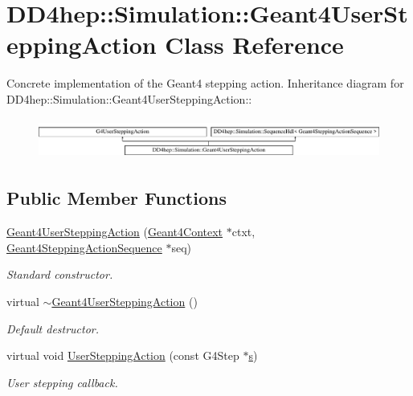 \hypertarget{class_d_d4hep_1_1_simulation_1_1_geant4_user_stepping_action}{
\section{DD4hep::Simulation::Geant4UserSteppingAction Class Reference}
\label{class_d_d4hep_1_1_simulation_1_1_geant4_user_stepping_action}
}


Concrete implementation of the Geant4 stepping action.  
Inheritance diagram for DD4hep::Simulation::Geant4UserSteppingAction::\begin{figure}[H]
\begin{center}
\leavevmode
\includegraphics[height=1.3494cm]{class_d_d4hep_1_1_simulation_1_1_geant4_user_stepping_action}
\end{center}
\end{figure}
\subsection*{Public Member Functions}
\begin{DoxyCompactItemize}
\item 
\hyperlink{class_d_d4hep_1_1_simulation_1_1_geant4_user_stepping_action_a846e10589493c89d4ed2081312d17a1d}{Geant4UserSteppingAction} (\hyperlink{class_d_d4hep_1_1_simulation_1_1_geant4_context}{Geant4Context} $\ast$ctxt, \hyperlink{class_d_d4hep_1_1_simulation_1_1_geant4_stepping_action_sequence}{Geant4SteppingActionSequence} $\ast$seq)
\begin{DoxyCompactList}\small\item\em Standard constructor. \item\end{DoxyCompactList}\item 
virtual \hyperlink{class_d_d4hep_1_1_simulation_1_1_geant4_user_stepping_action_a7c9e7f202db5ebf3300c1d2c6d9aa1d2}{$\sim$Geant4UserSteppingAction} ()
\begin{DoxyCompactList}\small\item\em Default destructor. \item\end{DoxyCompactList}\item 
virtual void \hyperlink{class_d_d4hep_1_1_simulation_1_1_geant4_user_stepping_action_a459952dec8bab794c933b464471d7b60}{UserSteppingAction} (const G4Step $\ast$\hyperlink{_volumes_8cpp_a17ca6bfc8040d695d3cada22a4763d40}{s})
\begin{DoxyCompactList}\small\item\em User stepping callback. \item\end{DoxyCompactList}\end{DoxyCompactItemize}


